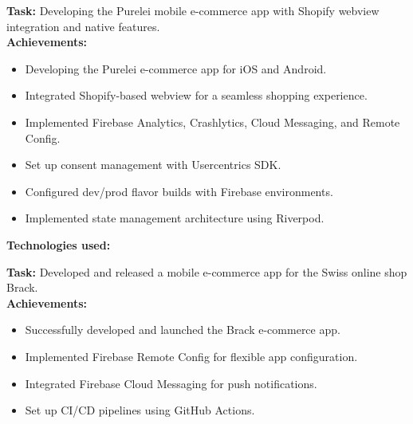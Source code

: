 \documentclass[10pt,a4paper,normalphoto]{altacv}
\begin{document}
\begin{fullwidth}
\textbf{Task:} Developing the Purelei mobile e-commerce app with Shopify webview integration and native features.\\
\textbf{Achievements:}
\begin{itemize}
    \item Developing the Purelei e-commerce app for iOS and Android.
    \item Integrated Shopify-based webview for a seamless shopping experience.
    \item Implemented Firebase Analytics, Crashlytics, Cloud Messaging, and Remote Config.
    \item Set up consent management with Usercentrics SDK.
    \item Configured dev/prod flavor builds with Firebase environments.
    \item Implemented state management architecture using Riverpod.
\end{itemize}

\textbf{Technologies used:}\\[0.4em]

\vspace{2em}

\textbf{Task:} Developed and released a mobile e-commerce app for the Swiss online shop Brack.\\
\textbf{Achievements:}
\begin{itemize}
    \item Successfully developed and launched the Brack e-commerce app.
    \item Implemented Firebase Remote Config for flexible app configuration.
    \item Integrated Firebase Cloud Messaging for push notifications.
    \item Set up CI/CD pipelines using GitHub Actions.
\end{itemize}


\end{fullwidth}
\end{document}
